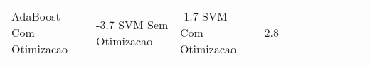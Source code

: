 \begin{table}[H]
\begin{adjustwidth}{ -1in }{ -1in }
\begin{tabular}{lllllllllll}
           AdaBoost Com Otimizacao &      -3.7%
                SVM Sem Otimizacao &      -1.7%
                SVM Com Otimizacao &       2.8%
\bottomrule
\end{tabular}
    \end{adjustwidth}
    \renewcommand{\arraystretch}{1.0} %
\end{table}

